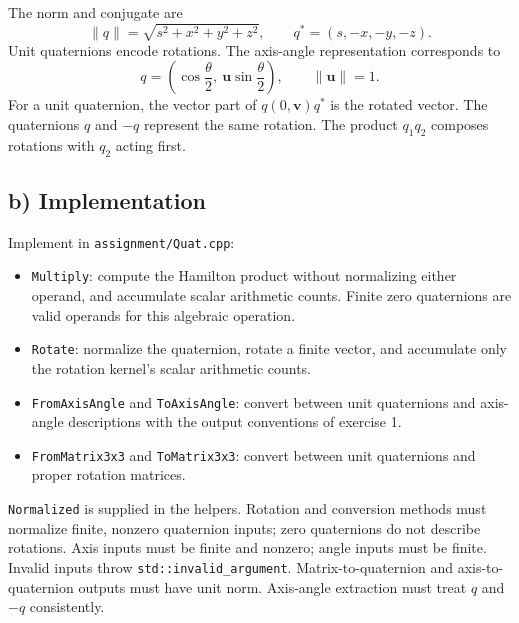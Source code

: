 \documentclass[11pt,a4paper]{article}
\newcommand{\vect}[1]{\bm{#1}}
\begin{document}
The norm and conjugate are
\[
\|q\|=\sqrt{s^2+x^2+y^2+z^2},\qquad
q^*=(s,-x,-y,-z).
\]
Unit quaternions encode rotations. The axis-angle representation corresponds to
\[
q=\left(\cos\frac{\theta}{2},\
\vect{u}\sin\frac{\theta}{2}\right),
\qquad \|\vect{u}\|=1.
\]
For a unit quaternion, the vector part of $q(0,\vect{v})q^*$ is the rotated
vector. The quaternions $q$ and $-q$ represent the same rotation.
The product $q_1q_2$ composes rotations with $q_2$ acting first.

\subsection*{b) Implementation}

Implement in \texttt{assignment/Quat.cpp}:
\begin{itemize}[leftmargin=*]
    \item \texttt{Multiply}: compute the Hamilton product without normalizing
    either operand, and accumulate scalar arithmetic counts. Finite zero
    quaternions are valid operands for this algebraic operation.
    \item \texttt{Rotate}: normalize the quaternion, rotate a finite vector,
    and accumulate only the rotation kernel's scalar arithmetic counts.
    \item \texttt{FromAxisAngle} and \texttt{ToAxisAngle}: convert between
    unit quaternions and axis-angle descriptions with the output conventions
    of exercise 1.
    \item \texttt{FromMatrix3x3} and \texttt{ToMatrix3x3}: convert between
    unit quaternions and proper rotation matrices.
\end{itemize}

\texttt{Normalized} is supplied in the helpers. Rotation and conversion methods
must normalize finite, nonzero quaternion inputs; zero quaternions do not
describe rotations. Axis inputs must be finite and nonzero; angle inputs must
be finite. Invalid inputs throw \texttt{std::invalid\_argument}.
Matrix-to-quaternion and axis-to-quaternion outputs must have unit norm.
Axis-angle extraction must treat $q$ and $-q$ consistently.
\end{document}

